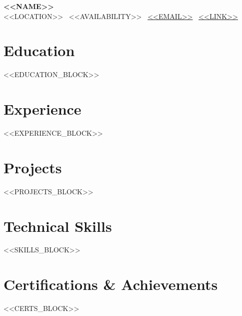 \documentclass[10pt]{article}
\newcommand{\resumeheader}[5]{\begin{center}{\Large\bfseries #1}\\[0.1em]#2 \textbar\ #3 \textbar\ \href{mailto:#4}{#4} \textbar\ \href{#5}{#5}\end{center}\vspace{0.3em}}
\begin{document}
\resumeheader{<<NAME>>}{<<LOCATION>>}{<<AVAILABILITY>>}{<<EMAIL>>}{<<LINK>>}

\section{Education}
<<EDUCATION_BLOCK>>

\section{Experience}
<<EXPERIENCE_BLOCK>>

\section{Projects}
<<PROJECTS_BLOCK>>

\section{Technical Skills}
<<SKILLS_BLOCK>>

\section{Certifications \& Achievements}
<<CERTS_BLOCK>>
\end{document}
